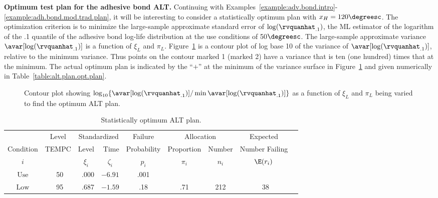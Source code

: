 \begin{example}
\label{example:adh.bond.opt.plan}
{\bf Optimum test plan for the adhesive bond ALT.} Continuing with
Examples~\ref{example:adv.bond.intro}-\ref{example:adh.bond.mod.trad.plan},
it will be interesting to consider a statistically optimum plan with
$x_{H}=120\degreesc$. The optimization criterion is to minimize the
large-sample approximate standard error of
$\log(\rvquanhat_{.1})$, the ML estimator of the logarithm of the .1
quantile of the adhesive bond log-life distribution at the use
conditions of 50$\degreesc$.  The large-sample approximate variance
$\avar[\log(\rvquanhat_{.1})]$ is a function of $\xi_{L}$ and
$\pi_{L}$.  Figure~\ref{figure:opt.contour.ps} is a contour plot of
log base 10 of the variance of $\avar[\log(\rvquanhat_{.1})]$,
relative to the minimum variance.  Thus points on the contour marked
1 (marked 2) have a variance that is ten (one hundred) times that at
the minimum.  The actual optimum plan is indicated by the ``$+$'' at
the minimum of the variance surface in
Figure~\ref{figure:opt.contour.ps} and given numerically in
Table~\ref{table:alt.plan.opt.plan}.
\begin{figure}
\caption{Contour plot showing
$\log_{10}
\{\avar[\log(\rvquanhat_{.1})]/\min\avar[\log(\rvquanhat_{.1})]\} $ as
a function of $\xi_{L}$ and $\pi_{L}$ being varied to find the optimum ALT
plan.}
\label{figure:opt.contour.ps}
\end{figure}
\begin{table}
\caption{Statistically optimum ALT plan.}
\centering\small
\begin{tabular}{ccrrccccc}
\\[-.5ex]
\hline
     &
Level&  \multicolumn{2}{c}{Standardized} &Failure & \multicolumn{2}{c}{Allocation}  & Expected    \\ \cline {3-4} \cline{6-7}
Condition&TEMPC &  Level& Time &   Probability & Proportion & Number & Number Failing\\
$i$ & & \multicolumn{1}{c}{$\xi_{i}$} & \multicolumn{1}{c}{$\zeta_{i}$}&  $p_{i}$  & $\pi_{i}$ &$n_{i}$& $\E(r_{i})$ \\
\hline
$\mbox{Use}$ &\mbox{ 50}&.000  &$-6.91$ &   .001  &     &     &           \\
$\mbox{Low}$ &\mbox{ 95}&.687  &$-1.59$ &   .18   & .71 & 212 & \mbox{ 38} \\

\end{tabular}
\end{table}
\end{example}
